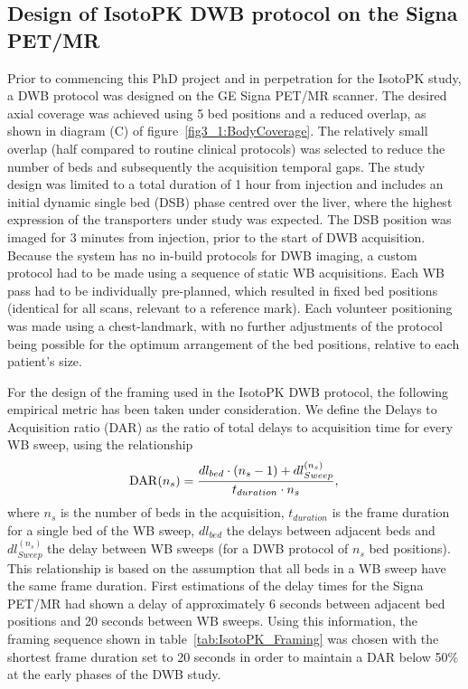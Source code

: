\subsection{Design of IsotoPK DWB protocol on the Signa PET/MR}
Prior to commencing this PhD project and in perpetration for the IsotoPK study, a DWB protocol was designed on the GE Signa PET/MR scanner. The desired axial coverage was achieved using 5 bed positions and a reduced overlap, as shown in diagram (C) of figure~\ref{fig3_1:BodyCoverage}. The relatively small overlap (half compared to routine clinical protocols) was selected to reduce the number of beds and subsequently the acquisition temporal gaps.
The study design was limited to a total duration of 1 hour from injection and includes an initial dynamic single bed (DSB) phase centred over the liver, where the highest expression of the transporters under study was expected. 
The DSB position was imaged for 3 minutes from injection, prior to the start of DWB acquisition.
Because the system has no in-build protocols for DWB imaging, a custom protocol had to be made using a sequence of static WB acquisitions. Each WB pass had to be individually pre-planned, which resulted in fixed bed positions (identical for all scans, relevant to a reference mark). Each volunteer positioning was made using a chest-landmark, with no further adjustments of the protocol being possible for the optimum arrangement of the bed positions, relative to each patient's size.

For the design of the framing used in the IsotoPK DWB protocol, the following empirical metric has been taken under consideration. We define the Delays to Acquisition ratio (DAR) as the ratio of total delays to acquisition time for every WB sweep, using the relationship
\begin{equation} \label{eqn:acq_to_dead_time}
 \mathrm{DAR}(n_s) = \frac{dl_{bed}\cdot (n_s-1) + dl_{Sweep}^{(n_s)}}{t_{duration}\cdot n_s }  \\ , \\ 
\end{equation}
where $n_s$ is the number of beds in the acquisition, $t_{duration}$ is the frame duration for a single bed of the WB sweep, $dl_{bed}$ the delays between adjacent beds and $dl_{Sweep}^{(n_s)}$ the delay between WB sweeps (for a DWB protocol of $n_s$ bed positions). This relationship is based on the assumption that all beds in a WB sweep have the same frame duration.
First estimations of the delay times for the Signa PET/MR had shown a delay of approximately 6 seconds between adjacent bed positions and 20 seconds between WB sweeps. Using this information, the framing sequence shown in table~\ref{tab:IsotoPK_Framing} was chosen with the shortest frame duration set to 20 seconds in order to maintain a DAR below 50\% at the early phases of the DWB study. 

